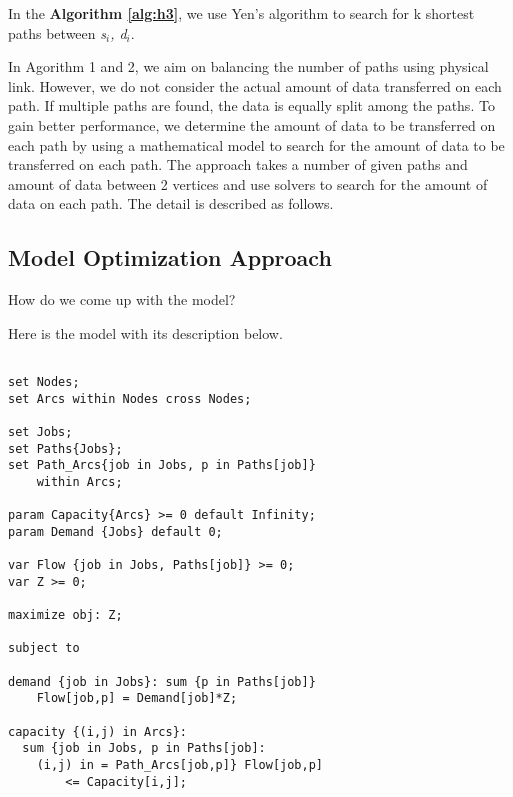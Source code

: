 In the \textbf{Algorithm \ref{alg:h3}}, we use Yen's algorithm to search for k shortest paths between \textit{s$_i$, d$_i$}.

In Agorithm 1 and 2, we aim on balancing the number of paths using physical link. However, we do not consider the actual amount of data transferred on each path. If multiple paths are found, the data is equally split among the paths. To gain better performance, we determine the amount of data to be transferred on each path by using a mathematical model to search for the amount of data to be transferred on each path. The approach takes a number of given paths and amount of data between 2 vertices and use solvers to search for the amount of data on each path. The detail is described as follows.

\subsection{Model Optimization Approach}

How do we come up with the model?

Here is the model with its description below.

\begingroup
\fontsize{9pt}{9pt}\selectfont

\begin{verbatim}

set Nodes;
set Arcs within Nodes cross Nodes;

set Jobs;
set Paths{Jobs};
set Path_Arcs{job in Jobs, p in Paths[job]} 
    within Arcs;

param Capacity{Arcs} >= 0 default Infinity;
param Demand {Jobs} default 0;

var Flow {job in Jobs, Paths[job]} >= 0;
var Z >= 0;

maximize obj: Z;

subject to

demand {job in Jobs}: sum {p in Paths[job]} 
	Flow[job,p] = Demand[job]*Z;

capacity {(i,j) in Arcs}:
  sum {job in Jobs, p in Paths[job]: 
    (i,j) in = Path_Arcs[job,p]} Flow[job,p] 
		<= Capacity[i,j];

\end{verbatim}

\endgroup

